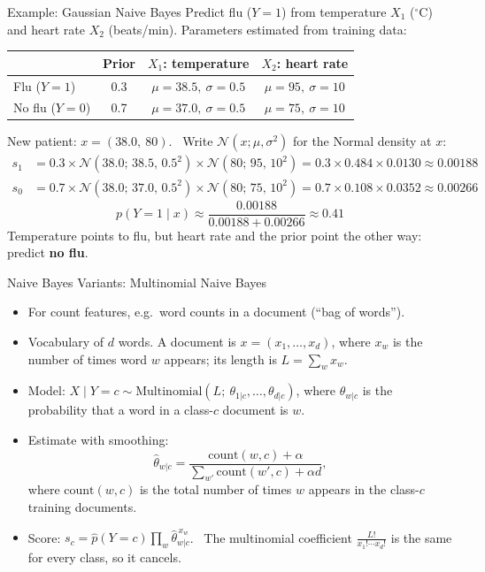 \documentclass[aspectratio=169]{beamer}
\begin{document}
\begin{frame}{Example: Gaussian Naive Bayes}
Predict flu ($Y=1$) from temperature $X_1$ ($^\circ$C) and heart rate $X_2$ (beats/min).
Parameters estimated from training data:
\begin{center}
\begin{tabular}{lccc}
\toprule
 & Prior & $X_1$: temperature & $X_2$: heart rate \\
\midrule
Flu ($Y=1$)    & 0.3 & $\mu=38.5,\ \sigma=0.5$ & $\mu=95,\ \sigma=10$ \\
No flu ($Y=0$) & 0.7 & $\mu=37.0,\ \sigma=0.5$ & $\mu=75,\ \sigma=10$ \\
\bottomrule
\end{tabular}
\end{center}
New patient: $x=(38.0,\ 80)$. \ Write $\mathcal{N}(x;\mu,\sigma^2)$ for the Normal density at $x$:
\begin{align*}
  s_1 &= 0.3\times \mathcal{N}(38.0;\,38.5,\,0.5^2)\times\mathcal{N}(80;\,95,\,10^2) = 0.3\times 0.484\times 0.0130 \approx 0.00188\\
  s_0 &= 0.7\times \mathcal{N}(38.0;\,37.0,\,0.5^2)\times\mathcal{N}(80;\,75,\,10^2) = 0.7\times 0.108\times 0.0352 \approx 0.00266
\end{align*}
\[
  p(Y=1\mid x) \approx \frac{0.00188}{0.00188+0.00266} \approx 0.41
\]
Temperature points to flu, but heart rate and the prior point the other way: predict \textbf{no flu}.
\end{frame}

\begin{frame}{Naive Bayes Variants: Multinomial Naive Bayes}
\begin{itemize}
  \item For count features, e.g.\ word counts in a document (``bag of words'').
  \item Vocabulary of $d$ words. A document is $x=(x_1,\dots,x_d)$, where $x_w$ is the number of times word $w$ appears; its length is $L=\sum_w x_w$.
  \item Model: $X\mid Y=c \sim \mathrm{Multinomial}(L;\ \theta_{1|c},\dots,\theta_{d|c})$, where $\theta_{w|c}$ is the probability that a word in a class-$c$ document is $w$.
  \item Estimate with smoothing:
  \[
    \hat\theta_{w|c}=\frac{\text{count}(w,c)+\alpha}{\sum_{w'}\text{count}(w',c)+\alpha d},
  \]
  where $\text{count}(w,c)$ is the total number of times $w$ appears in the class-$c$ training documents.
  \item Score: $s_c = \hat p(Y=c)\prod_{w}\hat\theta_{w|c}^{\,x_w}$. \
        The multinomial coefficient $\frac{L!}{x_1!\cdots x_d!}$ is the same for every class, so it cancels.
\end{itemize}
\end{frame}
\end{document}
